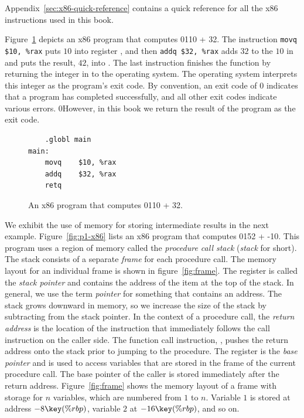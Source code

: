 \documentclass[7x10]{TimesAPriori_MIT}%
\def\racketEd{0}
\def\pythonEd{1}
\def\edition{1}
\newcommand{\racket}[1]{{\if\edition\racketEd{#1}\fi}}
\newcommand{\pythonColor}[0]{}
\newcommand{\python}[1]{{\if\edition\pythonEd\pythonColor #1\fi}}
\numberwithin{theorem}{chapter}
\numberwithin{definition}{chapter}
\numberwithin{equation}{chapter}
\begin{document}
Appendix~\ref{sec:x86-quick-reference} contains a quick reference for
all the x86 instructions used in this book.

Figure~\ref{fig:p0-x86} depicts an x86 program that computes
\racket{}\python{10 + 32}. The instruction
\lstinline{movq $10, %rax}
puts $10$ into register , and then \lstinline{addq $32, %rax}
adds $32$ to the $10$ in  and
puts the result, $42$, into .
%
The last instruction  finishes the  function by
returning the integer in  to the operating system. The
operating system interprets this integer as the program's exit
code. By convention, an exit code of 0 indicates that a program has
completed successfully, and all other exit codes indicate various
errors.
%
\racket{However, in this book we return the result of the program
  as the exit code.}

\begin{figure}[tbp]
\begin{minipage}{0.45\textwidth}
\begin{tcolorbox}[colback=white]
\begin{lstlisting}
	.globl main
main:
	movq	$10, %rax
	addq	$32, %rax
	retq
\end{lstlisting}
\end{tcolorbox}
\end{minipage}

\caption{An x86 program that computes
  \racket{}\python{10 + 32}.}
\label{fig:p0-x86}
\end{figure}

We exhibit the use of memory for storing intermediate results in the
next example.  Figure~\ref{fig:p1-x86} lists an x86 program that
computes \racket{}\python{52 + -10}. This program
uses a region of memory called the \emph{procedure call stack}
(\emph{stack} for
short). 
The stack consists of a separate \emph{frame}
for each procedure call. The memory layout for an individual frame is
shown in figure~\ref{fig:frame}.  The register  is called the
\emph{stack pointer} and contains the
address of the item at the top of the stack.  In general, we use the
term \emph{pointer} for something that
contains an address. The stack grows downward in memory, so we
increase the size of the stack by subtracting from the stack pointer.
In the context of a procedure call, the \emph{return
  address} is the location of the
instruction that immediately follows the call instruction on the
caller side.  The function call instruction, , pushes the
return address onto the stack prior to jumping to the procedure.  The
register  is the \emph{base pointer} and is used to access variables that are stored in the
frame of the current procedure call.  The base pointer of the caller
is stored immediately after the return address.
Figure~\ref{fig:frame} shows the memory layout of a frame with storage
for $n$ variables, which are numbered from $1$ to $n$. Variable $1$ is
stored at address $-8\key{(\%rbp)}$, variable $2$ at
$-16\key{(\%rbp)}$, and so on.
\end{document}

